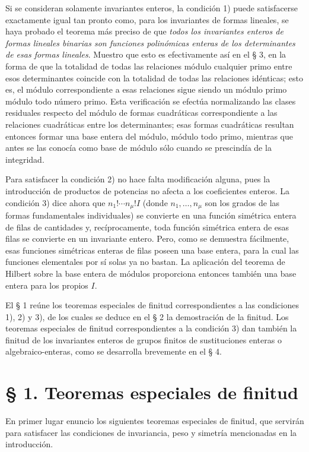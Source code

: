 \documentclass[11pt]{article}
\begin{document}
Si se consideran solamente invariantes enteros, la condición 1) puede satisfacerse exactamente igual tan pronto como, para los invariantes de formas lineales, se haya probado el teorema más preciso de que \emph{todos los invariantes enteros de formas lineales binarias son funciones polinómicas enteras de los determinantes de esas formas lineales}. Muestro que esto es efectivamente así en el § 3, en la forma de que la totalidad de todas las relaciones módulo cualquier primo entre esos determinantes coincide con la totalidad de todas las relaciones idénticas; esto es, el módulo correspondiente a esas relaciones sigue siendo un módulo primo módulo todo número primo. Esta verificación se efectúa normalizando las clases residuales respecto del módulo de formas cuadráticas correspondiente a las relaciones cuadráticas entre los determinantes; esas formas cuadráticas resultan entonces formar una base entera del módulo, módulo todo primo, mientras que antes se las conocía como base de módulo sólo cuando se prescindía de la integridad.

Para satisfacer la condición 2) no hace falta modificación alguna, pues la introducción de productos de potencias no afecta a los coeficientes enteros. La condición 3) dice ahora que \(n_1!\cdots n_\mu! I\) (donde \(n_1,\ldots,n_\mu\) son los grados de las formas fundamentales individuales) se convierte en una función simétrica entera de filas de cantidades y, recíprocamente, toda función simétrica entera de esas filas se convierte en un invariante entero. Pero, como se demuestra fácilmente, esas funciones simétricas enteras de filas poseen una base entera, para la cual las funciones elementales por sí solas ya no bastan. La aplicación del teorema de Hilbert sobre la base entera de módulos proporciona entonces también una base entera para los propios \(I\).

El § 1 reúne los teoremas especiales de finitud correspondientes a las condiciones 1), 2) y 3), de los cuales se deduce en el § 2 la demostración de la finitud. Los teoremas especiales de finitud correspondientes a la condición 3) dan también la finitud de los invariantes enteros de grupos finitos de sustituciones enteras o algebraico-enteras, como se desarrolla brevemente en el § 4.

\section*{§ 1. Teoremas especiales de finitud}

En primer lugar enuncio los siguientes teoremas especiales de finitud, que servirán para satisfacer las condiciones de invariancia, peso y simetría mencionadas en la introducción.
\end{document}
